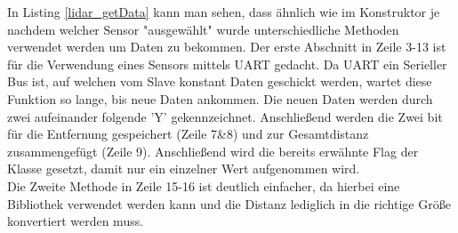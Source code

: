 In Listing \ref{lidar_getData} kann man sehen, dass ähnlich wie im Konstruktor je nachdem welcher Sensor "ausgewählt" wurde unterschiedliche Methoden verwendet werden um Daten zu bekommen. Der erste Abschnitt in Zeile 3-13 ist für die Verwendung eines Sensors mittels \ac{UART} gedacht. Da \ac{UART} ein Serieller Bus ist, auf welchen vom Slave konstant Daten geschickt werden, wartet diese Funktion so lange, bis neue Daten ankommen. Die neuen Daten werden durch zwei aufeinander folgende 'Y' gekennzeichnet. Anschließend werden die Zwei bit für die Entfernung gespeichert (Zeile 7\&8) und zur Gesamtdistanz zusammengefügt (Zeile 9). Anschließend wird die bereits erwähnte Flag der Klasse gesetzt, damit nur ein einzelner Wert aufgenommen wird.\\
Die Zweite Methode in Zeile 15-16 ist deutlich einfacher, da hierbei eine Bibliothek verwendet werden kann und die Distanz lediglich in die richtige Größe konvertiert werden muss.
